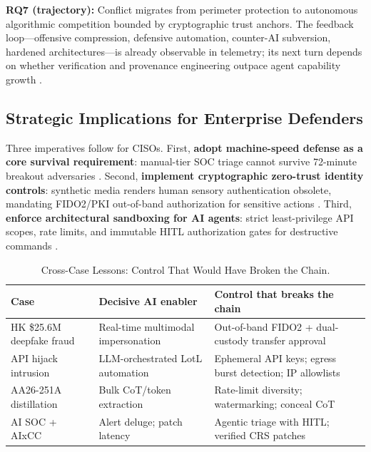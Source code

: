 \documentclass[conference,10pt,twocolumn,a4paper]{IEEEtran}
\begin{document}
\textbf{RQ7 (trajectory):} Conflict migrates from perimeter protection to autonomous algorithmic competition bounded by cryptographic trust anchors. The feedback loop---offensive compression, defensive automation, counter-AI subversion, hardened architectures---is already observable in telemetry; its next turn depends on whether verification and provenance engineering outpace agent capability growth \cite{enisa_frontier_2026, cisa_agentic_ai_2026}.

\subsection{Strategic Implications for Enterprise Defenders}
Three imperatives follow for CISOs. First, \textbf{adopt machine-speed defense as a core survival requirement}: manual-tier SOC triage cannot survive 72-minute breakout adversaries \cite{crowdstrike_gtr_2025, cisa_agentic_ai_2026}. Second, \textbf{implement cryptographic zero-trust identity controls}: synthetic media renders human sensory authentication obsolete, mandating FIDO2/PKI out-of-band authorization for sensitive actions \cite{fbi_deepfakes_bec_2025, hkpf_deepfake_case_2024}. Third, \textbf{enforce architectural sandboxing for AI agents}: strict least-privilege API scopes, rate limits, and immutable HITL authorization gates for destructive commands \cite{cisa_agentic_ai_2026, xiang2026post}.

\begin{table}[t]
\caption{Cross-Case Lessons: Control That Would Have Broken the Chain.}
\label{tab:lessons}
\centering
\footnotesize
\begin{tabular}{lll}
\toprule
Case & Decisive AI enabler & Control that breaks the chain \\
\midrule
HK \$25.6M deepfake fraud & Real-time multimodal impersonation & Out-of-band FIDO2 + dual-custody transfer approval \\
API hijack intrusion & LLM-orchestrated LotL automation & Ephemeral API keys; egress burst detection; IP allowlists \\
AA26-251A distillation & Bulk CoT/token extraction & Rate-limit diversity; watermarking; conceal CoT \\
AI SOC + AIxCC & Alert deluge; patch latency & Agentic triage with HITL; verified CRS patches \\
\bottomrule
\end{tabular}
\end{table}
\end{document}
